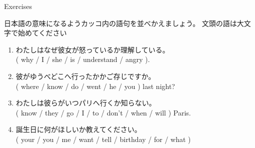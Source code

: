 \documentclass[aspectratio=169,xcolor={dvipsnames,table}]{beamer}
\begin{document}
\begin{frame}[plain]{Exercises}\small

{\small 日本語の意味になるようカッコ内の語句を並べかえましょう。
文頭の語は大文字で始めてください}%
\mbox{}\hfill{\scriptsize {}}

 \begin{enumerate}
  \item {わたしはなぜ彼女が怒っているか理解している。}\\
( why / I / she / is / understand / angry ). \\
  \item {彼がゆうべどこへ行ったかかご存じですか。}\\
( where / know / do / went / he / you ) last night? \\
  \item {わたしは彼らがいつパリへ行くか知らない。}\\
( know / they / go / I / to / don't / when / will ) Paris. \\
  \item {誕生日に何がほしいか教えてください。}\\
( your / you / me / want / tell / birthday / for / what ) \\

 \end{enumerate}
\end{frame}
\end{document}
